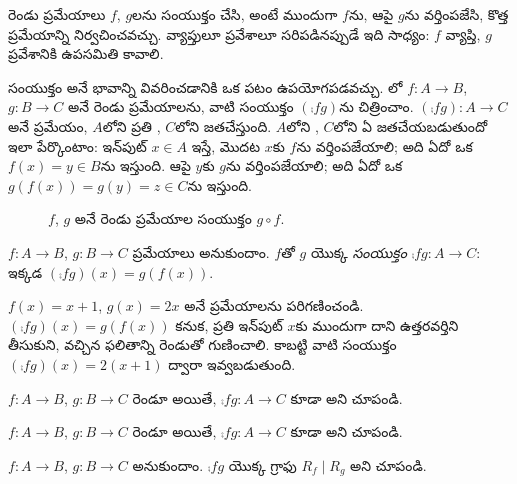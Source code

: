 \documentclass[../../../include/open-logic-section]{subfiles}
\begin{document}

\begin{explain}
రెండు ప్రమేయాలు $f$, $g$లను
సంయుక్తం చేసి, అంటే ముందుగా $f$ను, ఆపై $g$ను వర్తింపజేసి,
కొత్త ప్రమేయాన్ని నిర్వచించవచ్చు. వ్యాప్తులూ ప్రవేశాలూ సరిపడినప్పుడే
ఇది సాధ్యం: $f$ వ్యాప్తి, $g$ ప్రవేశానికి ఉపసమితి కావాలి.

సంయుక్తం అనే భావాన్ని వివరించడానికి ఒక పటం ఉపయోగపడవచ్చు.
లో $f \colon A \to B$, $g \colon B \to C$ అనే
రెండు ప్రమేయాలను, వాటి సంయుక్తం $(\comp{f}{g})$ను చిత్రించాం.
$(\comp{f}{g}) \colon A \to C$ అనే ప్రమేయం, $A$లోని ప్రతి
, $C$లోని  జతచేస్తుంది.
$A$లోని , $C$లోని ఏ  జతచేయబడుతుందో
ఇలా పేర్కొంటాం: ఇన్‌పుట్ $x \in A$ ఇస్తే, మొదట $x$కు $f$ను
వర్తింపజేయాలి; అది ఏదో ఒక $f(x) = y \in B$ను ఇస్తుంది.
ఆపై $y$కు $g$ను వర్తింపజేయాలి; అది ఏదో ఒక $g(f(x)) = g(y) = z \in C$ను ఇస్తుంది.
\begin{figure}
  \caption{$f$, $g$ అనే రెండు ప్రమేయాల సంయుక్తం $g \circ f$.}
\end{figure}
\end{explain}

\begin{defn}[సంయుక్తం]
$f\colon A \to B$, $g\colon B \to C$ ప్రమేయాలు అనుకుందాం.
$f$తో $g$ యొక్క \emph{సంయుక్తం} $\comp{f}{g} \colon A \to C$:
ఇక్కడ $(\comp{f}{g})(x) = g(f(x))$.
\end{defn}

\begin{ex}
$f(x) = x + 1$, $g(x) = 2x$ అనే ప్రమేయాలను పరిగణించండి.
$(\comp{f}{g})(x) = g(f(x))$ కనుక, ప్రతి ఇన్‌పుట్ $x$కు ముందుగా
దాని ఉత్తరవర్తిని తీసుకుని, వచ్చిన ఫలితాన్ని రెండుతో గుణించాలి.
కాబట్టి వాటి సంయుక్తం $(\comp{f}{g})(x) = 2(x+1)$ ద్వారా ఇవ్వబడుతుంది.
\end{ex}

\begin{prob}
$f \colon A \to B$, $g \colon B \to C$ రెండూ  అయితే,
$\comp{f}{g}\colon A \to C$ కూడా  అని చూపండి.
\end{prob}

\begin{prob}
$f \colon A \to B$, $g \colon B \to C$ రెండూ  అయితే,
$\comp{f}{g}\colon A \to C$ కూడా  అని చూపండి.
\end{prob}

\begin{prob}
$f \colon A \to B$, $g \colon B \to C$ అనుకుందాం.
$\comp{f}{g}$ యొక్క గ్రాఫు $R_f \mid R_g$ అని చూపండి.
\end{prob}
\end{document}
